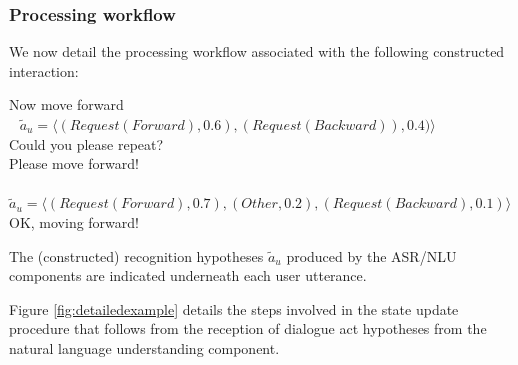 \subsubsection*{Processing workflow}

We now detail the processing workflow associated with the following constructed interaction:
\begin{dialogue} 
 Now move forward \\ $\phantom{b}$ $\tilde{a}_u = \langle (\mathit{Request(Forward)}, 0.6), (\mathit{Request(Backward)}), 0.4)\rangle$  \\[-3mm]
 Could you please repeat? \\[-3mm]
 Please move forward! \\ $\phantom{b}$ $\tilde{a}_u = \langle (\mathit{Request(Forward)}, 0.7), (\mathit{Other}, 0.2), (\mathit{Request(Backward)}, 0.1) \rangle$ \\[-3mm]
 OK, moving forward!
\end{dialogue}
The (constructed) recognition hypotheses $\tilde{a}_u$ produced by the ASR/NLU components are indicated underneath each user utterance. 

Figure \ref{fig:detailedexample} details the steps involved in the state update procedure that follows from the reception of dialogue act hypotheses from the natural language understanding component. 



